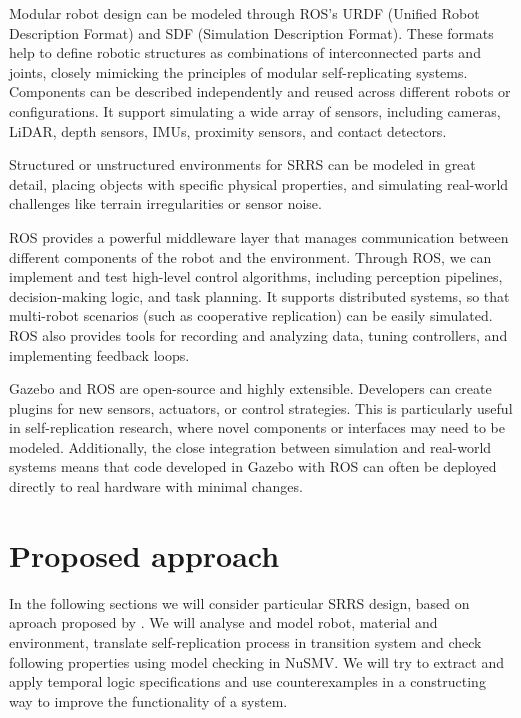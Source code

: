 Modular robot design  can be modeled through ROS’s URDF (Unified Robot 
Description Format) and SDF (Simulation Description Format). These formats 
help to define robotic structures as combinations of interconnected 
parts and joints, closely mimicking the principles of modular self-replicating 
systems. Components can be described independently and reused across different 
robots or configurations. It support simulating a wide array of sensors, including
cameras, LiDAR, depth sensors, IMUs, proximity sensors, and contact detectors. 

Structured or unstructured environments for SRRS can be modeled in great detail,
placing objects with specific physical properties, and simulating real-world 
challenges like terrain irregularities or sensor noise.

ROS provides a powerful middleware layer that manages communication between 
different components of the robot and the environment. 
Through ROS, we can implement and test high-level control algorithms, including perception 
pipelines, decision-making logic, and task planning.
It supports distributed systems, so that multi-robot scenarios 
(such as cooperative replication) can be easily simulated. 
ROS also provides tools for recording and analyzing 
data, tuning controllers, and implementing feedback loops. 

Gazebo and ROS are open-source and highly extensible. Developers can create 
plugins for new sensors, actuators, or control strategies. This is particularly 
useful in self-replication research, where novel components or interfaces 
may need to be modeled. 
Additionally, the close integration between simulation 
and real-world systems means that code developed in Gazebo with ROS can 
often be deployed directly to real hardware with minimal changes. 


\section{Proposed approach}

In the following sections we will consider particular SRRS design, based on aproach 
proposed by \citeauthor{Jenett2019MaterialRobot}. We will 
analyse and model robot, material and environment, translate self-replication process 
in transition system and check following properties using model checking in NuSMV.
We will try to extract and apply temporal logic specifications and use counterexamples
in a constructing way to improve the functionality of a system.

